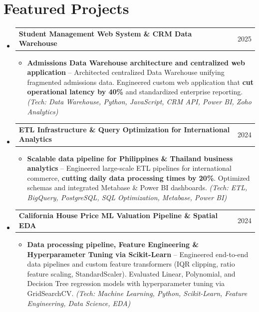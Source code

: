 \documentclass[letterpaper,11pt]{article}
\makeatletter
\newcommand{\resumeItem}[1]{
  \item\small{
    {#1 \vspace{1pt}}
  }
}
\newcommand{\resumeProjectHeading}[2]{
    \vspace{2pt}\item
    \begin{tabular*}{\textwidth}{l@{\extracolsep{\fill}}r}
      \small#1 & #2 \\
    \end{tabular*}\vspace{-2pt}
}
\newcommand{\resumeSubHeadingListStart}{\begin{itemize}[leftmargin=0.15in, label={}]}
\newcommand{\resumeSubHeadingListEnd}{\end{itemize}}
\newcommand{\resumeItemListStart}{\begin{itemize}[leftmargin=0.15in, itemsep=2.5pt, topsep=2pt, parsep=1.5pt]}
\newcommand{\resumeItemListEnd}{\end{itemize}\vspace{2pt}}
\makeatother
\begin{document}
\section*{Featured Projects}
  \resumeSubHeadingListStart
        \resumeProjectHeading
      {\textbf{Student Management Web System \& CRM Data Warehouse}}{2025}
      \resumeItemListStart
        \resumeItem{\textbf{Admissions Data Warehouse architecture and centralized web application} -- Architected centralized Data Warehouse unifying fragmented admissions data. Engineered custom web application that \textbf{cut operational latency by 40\%} and standardized enterprise reporting. \emph{(Tech: Data Warehouse, Python, JavaScript, CRM API, Power BI, Zoho Analytics)}}
      \resumeItemListEnd
    \resumeProjectHeading
      {\textbf{ETL Infrastructure \& Query Optimization for International Analytics}}{2024}
      \resumeItemListStart
        \resumeItem{\textbf{Scalable data pipeline for Philippines \& Thailand business analytics} -- Engineered large-scale ETL pipelines for international commerce, \textbf{cutting daily data processing times by 20\%}. Optimized schemas and integrated Metabase \& Power BI dashboards. \emph{(Tech: ETL, BigQuery, PostgreSQL, SQL Optimization, Metabase, Power BI)}}
      \resumeItemListEnd
    \resumeProjectHeading
      {\textbf{California House Price ML Valuation Pipeline \& Spatial EDA}}{2024}
      \resumeItemListStart
        \resumeItem{\textbf{Data processing pipeline, Feature Engineering \& Hyperparameter Tuning via Scikit-Learn} -- Engineered end-to-end data pipelines and custom feature transformers (IQR clipping, ratio feature scaling, StandardScaler). Evaluated Linear, Polynomial, and Decision Tree regression models with hyperparameter tuning via GridSearchCV. \emph{(Tech: Machine Learning, Python, Scikit-Learn, Feature Engineering, Data Science, EDA)}}
      \resumeItemListEnd
  \resumeSubHeadingListEnd

\end{document}
